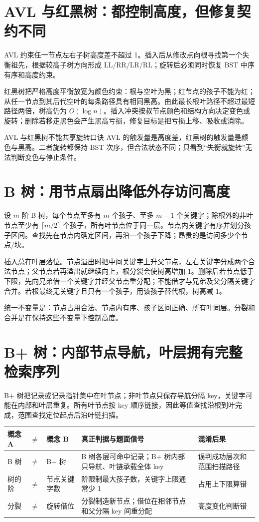 \documentclass[UTF8,fontset=none,11pt,a4paper]{ctexart}
\begin{document}
\section{AVL 与红黑树：都控制高度，但修复契约不同}
AVL 约束任一节点左右子树高度差不超过 1。插入后从修改点向根寻找第一个失衡祖先，根据较高子树方向形成 LL/RR/LR/RL；旋转后必须同时恢复 BST 中序有序和高度约束。

红黑树把严格高度平衡放宽为颜色约束：根与空叶为黑；红节点的孩子不能为红；从任一节点到其后代空叶的每条路径具有相同黑高。由此最长根叶路径不超过最短路径两倍，树高仍为 $O(\log n)$。插入冲突按叔节点颜色和结构方向决定变色或旋转；删除若移走黑色会产生黑高亏损，修复目标是把亏损上移、吸收或消除。

\begin{warnbox}{AVL 与红黑树不能共享旋转口诀}
AVL 的触发量是高度差，红黑树的触发量是颜色与黑高。二者旋转都保持 BST 次序，但合法状态不同；只看到“失衡就旋转”无法判断变色与停止条件。
\end{warnbox}

\section{B 树：用节点扇出降低外存访问高度}
设 $m$ 阶 B 树，每个节点至多有 $m$ 个孩子、至多 $m-1$ 个关键字；除根外的非叶节点至少有 $\lceil m/2\rceil$ 个孩子，所有叶节点位于同一层。节点内关键字有序并划分孩子区间。查找先在节点内确定区间，再沿一个孩子下降；昂贵的是访问多少个节点/块。

插入总在叶层落位。节点溢出时把中间关键字上升父节点，左右关键字分成两个合法节点；父节点若再溢出就继续向上，根分裂会使树高增加 1。删除后若节点低于下限，先向兄弟借一个关键字并经父节点重分配；不能借才与兄弟及父分隔关键字合并。若根最终无关键字且只有一个孩子，用该孩子替代根，树高减 1。

统一不变量是：节点占用合法、节点内有序、孩子区间正确、所有叶同层。分裂和合并是在保持这些不变量下控制高度。

\section{B+ 树：内部节点导航，叶层拥有完整检索序列}
B+ 树把记录或记录指针集中在叶节点；非叶节点只保存导航分隔 key，关键字可能在内部和叶层重复。所有叶节点按 key 顺序链接，因此等值查找沿根到叶完成，范围查找定位起点后沿叶链扫描。

\begin{center}\small
\begin{tabularx}{\linewidth}{L{2.0cm}C{.35cm}L{2.0cm}YY}\toprule
概念 A&$\neq$&概念 B&真正判据与题面信号&混淆后果\\\midrule
B 树&$\neq$&B+ 树&B 树各层可命中记录；B+ 树内部只导航、叶链承载全体 key&误判成功层次和范围扫描路径\\
树的阶&$\neq$&节点关键字数&阶限制最大孩子数，关键字上限通常少 1&占用上下限算错\\
分裂&$\neq$&旋转借位&分裂制造新节点；借位在相邻节点和父分隔 key 间重分配&高度变化判断错\\\bottomrule
\end{tabularx}\end{center}
\end{document}
